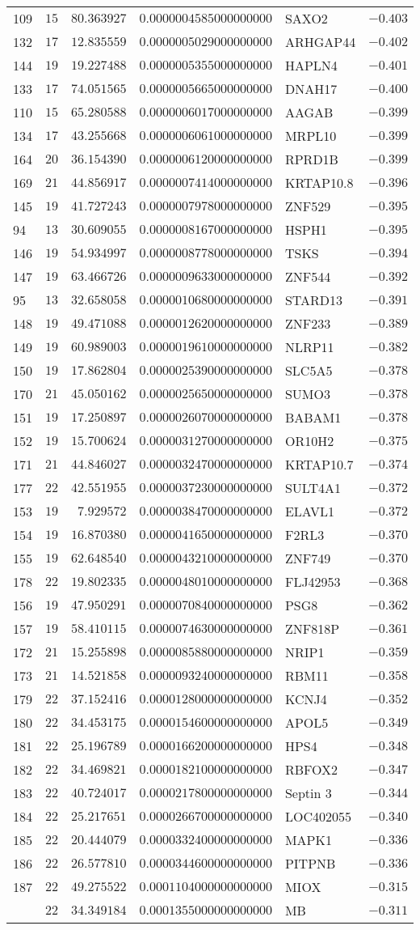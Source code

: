 {\begin{longtable}{lrrrlr}
109&$15$&$ 80.363927$&$0.0000004585000000000$&SAXO2&$-0.403$\tabularnewline
132&$17$&$ 12.835559$&$0.0000005029000000000$&ARHGAP44&$-0.402$\tabularnewline
144&$19$&$ 19.227488$&$0.0000005355000000000$&HAPLN4&$-0.401$\tabularnewline
133&$17$&$ 74.051565$&$0.0000005665000000000$&DNAH17&$-0.400$\tabularnewline
110&$15$&$ 65.280588$&$0.0000006017000000000$&AAGAB&$-0.399$\tabularnewline
134&$17$&$ 43.255668$&$0.0000006061000000000$&MRPL10&$-0.399$\tabularnewline
164&$20$&$ 36.154390$&$0.0000006120000000000$&RPRD1B&$-0.399$\tabularnewline
169&$21$&$ 44.856917$&$0.0000007414000000000$&KRTAP10.8&$-0.396$\tabularnewline
145&$19$&$ 41.727243$&$0.0000007978000000000$&ZNF529&$-0.395$\tabularnewline
94&$13$&$ 30.609055$&$0.0000008167000000000$&HSPH1&$-0.395$\tabularnewline
146&$19$&$ 54.934997$&$0.0000008778000000000$&TSKS&$-0.394$\tabularnewline
147&$19$&$ 63.466726$&$0.0000009633000000000$&ZNF544&$-0.392$\tabularnewline
95&$13$&$ 32.658058$&$0.0000010680000000000$&STARD13&$-0.391$\tabularnewline
148&$19$&$ 49.471088$&$0.0000012620000000000$&ZNF233&$-0.389$\tabularnewline
149&$19$&$ 60.989003$&$0.0000019610000000000$&NLRP11&$-0.382$\tabularnewline
150&$19$&$ 17.862804$&$0.0000025390000000000$&SLC5A5&$-0.378$\tabularnewline
170&$21$&$ 45.050162$&$0.0000025650000000000$&SUMO3&$-0.378$\tabularnewline
151&$19$&$ 17.250897$&$0.0000026070000000000$&BABAM1&$-0.378$\tabularnewline
152&$19$&$ 15.700624$&$0.0000031270000000000$&OR10H2&$-0.375$\tabularnewline
171&$21$&$ 44.846027$&$0.0000032470000000000$&KRTAP10.7&$-0.374$\tabularnewline
177&$22$&$ 42.551955$&$0.0000037230000000000$&SULT4A1&$-0.372$\tabularnewline
153&$19$&$  7.929572$&$0.0000038470000000000$&ELAVL1&$-0.372$\tabularnewline
154&$19$&$ 16.870380$&$0.0000041650000000000$&F2RL3&$-0.370$\tabularnewline
155&$19$&$ 62.648540$&$0.0000043210000000000$&ZNF749&$-0.370$\tabularnewline
178&$22$&$ 19.802335$&$0.0000048010000000000$&FLJ42953&$-0.368$\tabularnewline
156&$19$&$ 47.950291$&$0.0000070840000000000$&PSG8&$-0.362$\tabularnewline
157&$19$&$ 58.410115$&$0.0000074630000000000$&ZNF818P&$-0.361$\tabularnewline
172&$21$&$ 15.255898$&$0.0000085880000000000$&NRIP1&$-0.359$\tabularnewline
173&$21$&$ 14.521858$&$0.0000093240000000000$&RBM11&$-0.358$\tabularnewline
179&$22$&$ 37.152416$&$0.0000128000000000000$&KCNJ4&$-0.352$\tabularnewline
180&$22$&$ 34.453175$&$0.0000154600000000000$&APOL5&$-0.349$\tabularnewline
181&$22$&$ 25.196789$&$0.0000166200000000000$&HPS4&$-0.348$\tabularnewline
182&$22$&$ 34.469821$&$0.0000182100000000000$&RBFOX2&$-0.347$\tabularnewline
183&$22$&$ 40.724017$&$0.0000217800000000000$&Septin 3&$-0.344$\tabularnewline
184&$22$&$ 25.217651$&$0.0000266700000000000$&LOC402055&$-0.340$\tabularnewline
185&$22$&$ 20.444079$&$0.0000332400000000000$&MAPK1&$-0.336$\tabularnewline
186&$22$&$ 26.577810$&$0.0000344600000000000$&PITPNB&$-0.336$\tabularnewline
187&$22$&$ 49.275522$&$0.0001104000000000000$&MIOX&$-0.315$\tabularnewline
\newpage
188&$22$&$ 34.349184$&$0.0001355000000000000$&MB&$-0.311$\tabularnewline
\bottomrule
\end{longtable}}
\addtocounter{table}{-1}
